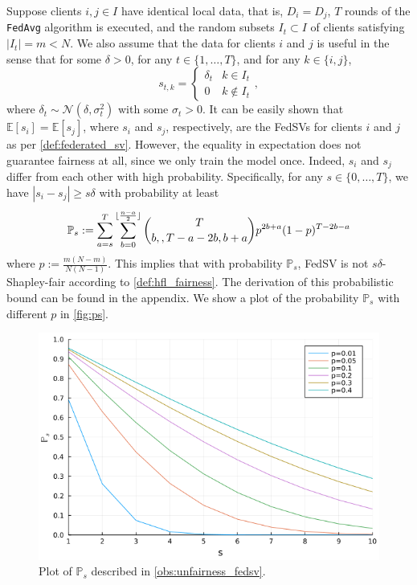 \begin{observation} \label{obs:unfairness_fedsv}
    Suppose clients $i, j \in I$ have identical local data, that is, $D_i = D_j$, $T$ rounds of the \texttt{FedAvg} algorithm is executed, and the random subsets $I_t \subset I$ of clients satisfying $|I_t| = m < N$. We also assume that the data for clients $i$ and $j$ is useful in the sense that for some $\delta > 0$, for any $t \in \{1, \dots, T\}$, and for any $k \in \{i,j\}$,
    \[s_{t, k} = 
        \begin{cases} 
      \delta_t & k \in I_t \\
      0 & k \notin I_t 
   \end{cases},\]
   where $\delta_t \sim \mathcal{N}(\delta, \sigma_t^2)$ with some $\sigma_t > 0$. It can be easily shown that $\mathbb{E}[s_i] = \mathbb{E}[s_j]$, where $s_i$ and $s_j$, respectively, are the FedSVs for clients $i$ and $j$ as per \autoref{def:federated_sv}. However, the equality in expectation does not guarantee fairness at all, since we only train the model once.
Indeed, $s_i$ and $s_j$ differ from each other with high probability. Specifically, for any $s \in \{0, \dots, T\}$, we have $|s_i - s_j| \geq s\delta$ with probability at least
    \[\mathbb{P}_s := \sum_{a = s}^T \sum_{b=0}^{\lfloor\frac{n-a}{2}\rfloor} \binom{T}{b,, T - a - 2b, b+a} p^{2b + a} (1-p)^{T - 2b - a}\]
    where $p := \frac{m(N-m)}{N(N-1)}$. This implies that with probability $\mathbb{P}_s$, FedSV is not $s\delta$-Shapley-fair according to \autoref{def:hfl_fairness}. The derivation of this probabilistic bound can be found in the appendix. We show a plot of the probability $\mathbb{P}_s$ with different $p$ in \autoref{fig:ps}.
    \begin{figure}[t]
        \centering
        \includegraphics[width=.7\textwidth]{./figures/ps.png}
        \caption{Plot of $\mathbb{P}_s$ described in \autoref{obs:unfairness_fedsv}.}
        \label{fig:ps}
    \end{figure}
\end{observation}

